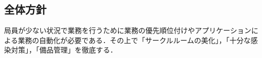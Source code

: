 \subsection*{全体方針}

局員が少ない状況で業務を行うために業務の優先順位付けやアプリケーションによる業務の自動化が必要である．その上で「サークルルームの美化」，「十分な感染対策」，「備品管理」を徹底する．
